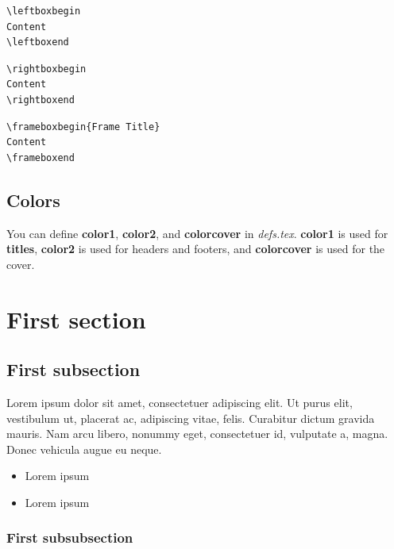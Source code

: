 \documentclass[12pt]{article}
\begin{document}
\begin{verbatim}
\leftboxbegin
Content
\leftboxend
\end{verbatim}

\begin{verbatim}
\rightboxbegin
Content
\rightboxend
\end{verbatim}

\begin{verbatim}
\frameboxbegin{Frame Title}
Content
\frameboxend
\end{verbatim}

\subsection{Colors}
You can define \textbf{color1}, \textbf{color2}, and \textbf{colorcover} in \textit{defs.tex}. \textbf{color1} is used for \textbf{titles}, \textbf{color2} is used for headers and footers, and \textbf{colorcover} is used for the cover.

\newpage

\section{First section}
\lipsum[1]

\fullboxbegin
\lipsum[1]
\fullboxend

\lipsum[1]

\subsection{First subsection}
\lipsum[1]

\leftboxbegin
Lorem ipsum dolor sit amet, consectetuer adipiscing elit. Ut purus elit, vestibulum ut, placerat ac, adipiscing vitae, felis. Curabitur dictum gravida mauris. Nam arcu libero, nonummy eget, consectetuer id, vulputate a, magna. Donec vehicula augue eu neque. 
\leftboxend

\lipsum[1-2]

\rightboxbegin
\begin{itemize}
 \item Lorem ipsum
 \item Lorem ipsum
\end{itemize}
\rightboxend

\lipsum[1]

\subsubsection{First subsubsection}
\end{document}
